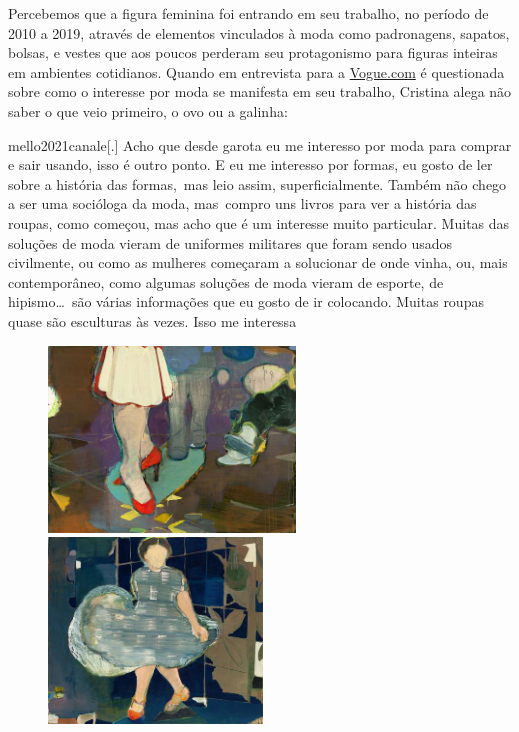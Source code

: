 Percebemos que a figura feminina foi entrando em seu trabalho, no
período de 2010 a 2019, através de elementos vinculados à moda como
padronagens, sapatos, bolsas, e vestes que aos poucos perderam seu
protagonismo para figuras inteiras em ambientes cotidianos. Quando em
entrevista para a \url{Vogue.com} é questionada sobre como o interesse por
moda se manifesta em seu trabalho, Cristina alega não saber o que veio
primeiro, o ovo ou a galinha:

\begin{displaycquote}{mello2021canale}[.]
	Acho que desde garota eu me interesso por moda para comprar e sair
	usando, isso é outro ponto. E eu me interesso por formas, eu gosto de
	ler sobre a história das formas,~mas leio assim, superficialmente.
	Também não chego a ser uma socióloga da moda, mas~compro uns livros
	para ver a história das roupas, como começou, mas acho que é um
	interesse muito particular. Muitas das soluções de moda vieram de
	uniformes militares que foram sendo usados civilmente, ou como as
	mulheres começaram a solucionar de onde vinha, ou, mais contemporâneo,
	como algumas soluções de moda vieram de esporte, de hipismo\ldots\ são
	várias informações que eu gosto de ir colocando. Muitas roupas quase
	são esculturas às vezes. Isso me interessa
\end{displaycquote}

\begin{figure}
	\begin{minipage}[t]{.45\linewidth}
		\caption{}
		\includegraphics[height=1.95in]{figuras/canale-desfile-2012.pdf.compressed.pdf}
	\end{minipage}\hfill
	\begin{minipage}[t]{.45\linewidth}
		\caption{}
		\includegraphics[height=1.95in]{figuras/canale-mimetismo-2012.pdf.compressed.pdf}
	\end{minipage}
\end{figure}

